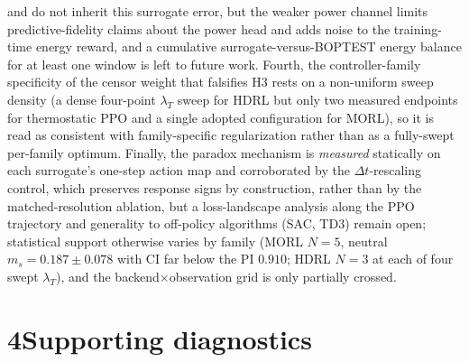 \documentclass[11pt,a4paper]{article}
\begin{document}
and do not inherit this surrogate error, but the weaker power channel limits predictive-fidelity
claims about the power head and adds noise to the training-time energy reward, and a cumulative
surrogate-versus-BOPTEST energy balance for at least one window is left to future work. Fourth, the
controller-family specificity of the censor weight that falsifies H3 rests on a non-uniform sweep
density (a dense four-point $\lambda_T$ sweep for HDRL but only two measured endpoints for
thermostatic PPO and a single adopted configuration for MORL), so it is read as consistent with
family-specific regularization rather than as a fully-swept per-family optimum. Finally, the
paradox mechanism is \emph{measured} statically on each surrogate's one-step action map and
corroborated by the $\Delta t$-rescaling control, which preserves response signs by construction,
rather than by the matched-resolution ablation, but a loss-landscape analysis along the PPO
trajectory and generality to off-policy algorithms (SAC, TD3) remain open; statistical support
otherwise varies by family (MORL $N=5$, neutral $m_s=0.187\pm0.078$ with CI far below the PI
$0.910$; HDRL $N=3$ at each of four swept $\lambda_T$), and the backend$\times$observation grid is
only partially crossed.

\clearpage
\section*{4\quad Supporting diagnostics}
\end{document}
